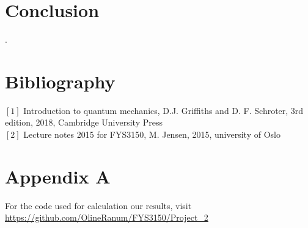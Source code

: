 \documentclass[%
reprint,
amsmath, 
amssymb, 
aps,]{revtex4-1}
\begin{document}
	\section*{Conclusion}


\newpage .
\newpage 
\onecolumngrid
\section*{Bibliography}
\noindent $[1]$ Introduction to quantum mechanics, D.J. Griffiths and D. F. Schroter, 3rd edition, 2018, Cambridge University Press\\ 
$[2]$ Lecture notes 2015 for FYS3150, M. Jensen, 2015, university of Oslo
\section*{Appendix A}
For the code used for calculation our results, visit
\url{https://github.com/OlineRanum/FYS3150/Project_2}
\end{document}

